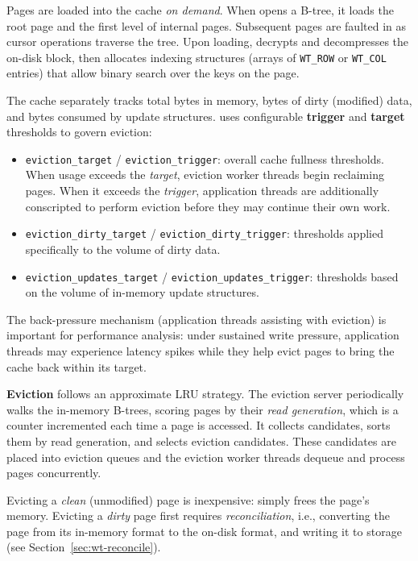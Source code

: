 Pages are loaded into the cache \emph{on demand}.
When \wt{} opens a B-tree, it loads the root page and the first level of internal pages.
Subsequent pages are faulted in as cursor operations traverse the tree.
Upon loading, \wt{} decrypts and decompresses the on-disk block, then allocates indexing structures (arrays of \texttt{WT\_ROW} or \texttt{WT\_COL} entries) that allow binary search over the keys on the page.

The cache separately tracks total bytes in memory, bytes of dirty (modified) data, and bytes consumed by update structures.  \wt{} uses configurable \textbf{trigger} and \textbf{target} thresholds to govern eviction:

\begin{itemize}
  \item \texttt{eviction\_target} / \texttt{eviction\_trigger}: overall cache
    fullness thresholds.  When usage exceeds the \emph{target}, eviction worker
    threads begin reclaiming pages.  When it exceeds the \emph{trigger},
    application threads are additionally conscripted to perform eviction before
    they may continue their own work.
  \item \texttt{eviction\_dirty\_target} / \texttt{eviction\_dirty\_trigger}:
    thresholds applied specifically to the volume of dirty data.
  \item \texttt{eviction\_updates\_target} /
    \texttt{eviction\_updates\_trigger}: thresholds based on the volume of
    in-memory update structures.
\end{itemize}

The back-pressure mechanism (application threads assisting with eviction) is important for performance analysis: under sustained write pressure, application threads may experience latency spikes while they help evict pages to bring the cache back within its target.

\textbf{Eviction} follows an approximate LRU strategy. 
The eviction server periodically walks the in-memory B-trees, scoring pages by their \emph{read generation}, which is a counter incremented each time a page is accessed.
It collects candidates, sorts them by read generation, and selects eviction candidates.
These candidates are placed into eviction queues and the eviction worker threads dequeue and process pages concurrently.

Evicting a \emph{clean} (unmodified) page is inexpensive: \wt{} simply
frees the page's memory.
Evicting a \emph{dirty} page first requires \emph{reconciliation}, i.e., converting the page from its in-memory format to the on-disk format, and writing it to storage (see Section~\ref{sec:wt-reconcile}).

